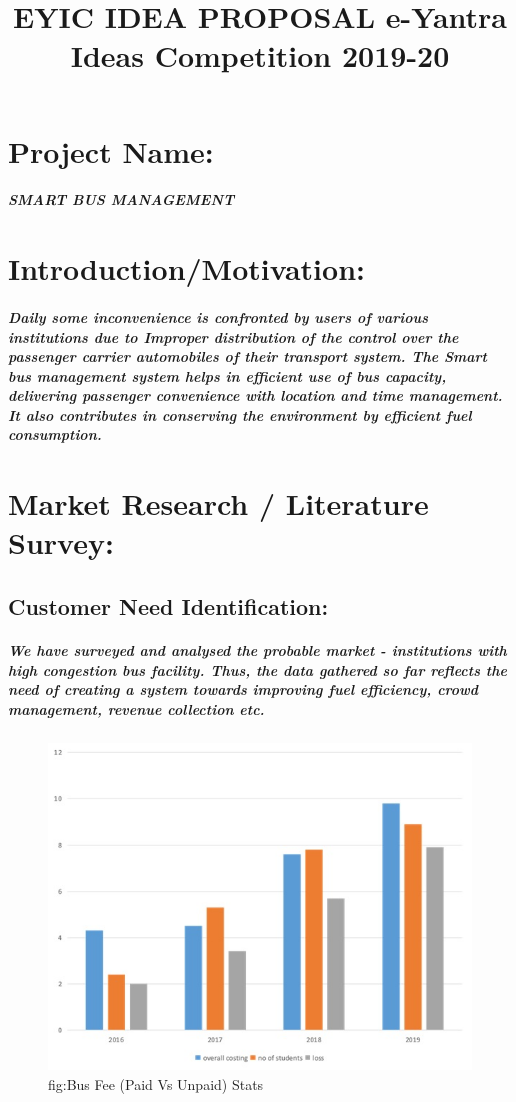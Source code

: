 \documentclass[]{article}
\title{EYIC IDEA PROPOSAL
	\linebreak 
	e-Yantra Ideas Competition 2019-20}
\date{}
\begin{document}
\maketitle{}
\section{Project Name:}
\subparagraph{SMART BUS MANAGEMENT}

\section{Introduction/Motivation:}
\subparagraph{Daily some inconvenience is confronted by users of various institutions due to Improper distribution of the control over the passenger carrier automobiles of their transport system. The Smart bus management system helps in efficient use of bus capacity, delivering passenger convenience with location and time management. It also contributes in conserving the environment by efficient fuel consumption.}


\section{Market Research / Literature Survey:}

\subsection{Customer Need Identification:}
\subparagraph{We have surveyed and analysed the probable market - institutions with high congestion bus facility. Thus, the data gathered so far reflects the need of creating a system towards improving fuel efficiency, crowd management, revenue collection etc.
}
\begin{figure}[h]
	\centering
	\includegraphics[width=0.5\linewidth,height=0.5\linewidth]{chart}
	\caption{fig:Bus Fee (Paid Vs Unpaid) Stats}
	\label{fig:Bus Fee (Paid Vs Unpaid) Stats}
\end{figure}
\end{document}
